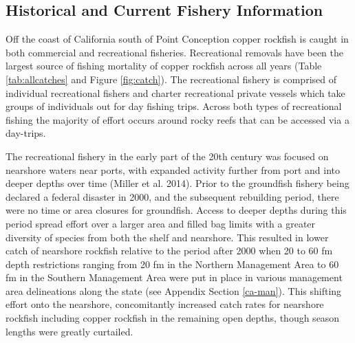 \documentclass[11pt,
  english,
  a4paper,
]{article}
\begin{document}
\leavevmode\tagmcend\tagstructend\par


\hypertarget{historical-and-current-fishery-information}{%
\subsection{Historical and Current Fishery Information}\label{historical-and-current-fishery-information}}

\leavevmode\tagmcend\tagstructend


Off the coast of California south of Point Conception copper rockfish is caught in both commercial and recreational fisheries. Recreational removals have been the largest source of fishing mortality of copper rockfish across all years (Table \ref{tab:allcatches} and Figure \ref{fig:catch}). The recreational fishery is comprised of individual recreational fishers and charter recreational private vessels which take groups of individuals out for day fishing trips. Across both types of recreational fishing the majority of effort occurs around rocky reefs that can be accessed via a day-trips.

\leavevmode\tagmcend\tagstructend\par


The recreational fishery in the early part of the 20th century was focused on nearshore waters near ports, with expanded activity further from port and into deeper depths over time {(Miller et al. 2014)\leavevmode\tagmcend\tagstructend}. Prior to the groundfish fishery being declared a federal disaster in 2000, and the subsequent rebuilding period, there were no time or area closures for groundfish. Access to deeper depths during this period spread effort over a larger area and filled bag limits with a greater diversity of species from both the shelf and nearshore. This resulted in lower catch of nearshore rockfish relative to the period after 2000 when 20 to 60 fm depth restrictions ranging from 20 fm in the Northern Management Area to 60 fm in the Southern Management Area were put in place in various management area delineations along the state (see Appendix Section \ref{ca-man}). This shifting effort onto the nearshore, concomitantly increased catch rates for nearshore rockfish including copper rockfish in the remaining open depths, though season lengths were greatly curtailed.
\end{document}
